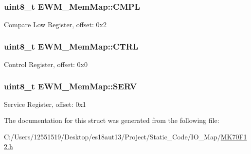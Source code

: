 \subsubsection[{C\+M\+P\+L}]{\setlength{\rightskip}{0pt plus 5cm}uint8\+\_\+t E\+W\+M\+\_\+\+Mem\+Map\+::\+C\+M\+P\+L}\label{struct_e_w_m___mem_map_ada0221f7554297f23a0257f54f28f5fc}
Compare Low Register, offset\+: 0x2 \hypertarget{struct_e_w_m___mem_map_a033a88d44ad1daa23ce3deb13bc94811}{}
\subsubsection[{C\+T\+R\+L}]{\setlength{\rightskip}{0pt plus 5cm}uint8\+\_\+t E\+W\+M\+\_\+\+Mem\+Map\+::\+C\+T\+R\+L}\label{struct_e_w_m___mem_map_a033a88d44ad1daa23ce3deb13bc94811}
Control Register, offset\+: 0x0 \hypertarget{struct_e_w_m___mem_map_aa9c25d4775f785d6911e096a226f4e40}{}
\subsubsection[{S\+E\+R\+V}]{\setlength{\rightskip}{0pt plus 5cm}uint8\+\_\+t E\+W\+M\+\_\+\+Mem\+Map\+::\+S\+E\+R\+V}\label{struct_e_w_m___mem_map_aa9c25d4775f785d6911e096a226f4e40}
Service Register, offset\+: 0x1 

The documentation for this struct was generated from the following file\+:\begin{DoxyCompactItemize}
\item 
C\+:/\+Users/12551519/\+Desktop/es18aut13/\+Project/\+Static\+\_\+\+Code/\+I\+O\+\_\+\+Map/\hyperlink{_m_k70_f12_8h}{M\+K70\+F12.\+h}\end{DoxyCompactItemize}
